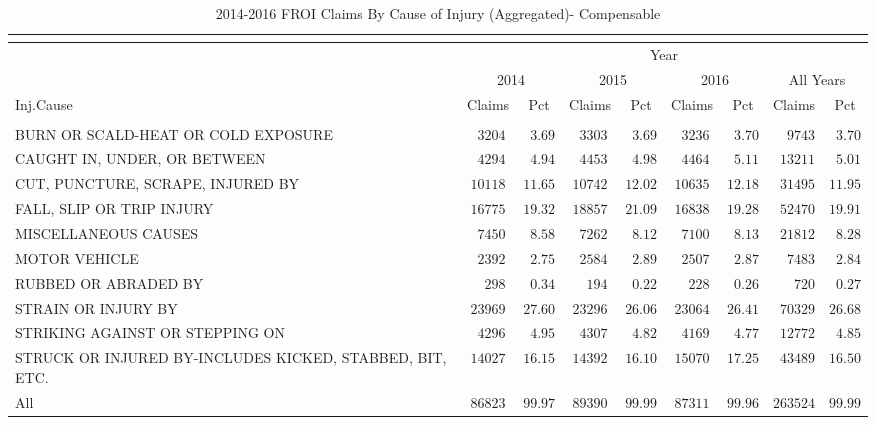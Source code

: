\documentclass[9pt, oneside]{article}   	%
\begin{document}
\begin{longtable}{p{2.5in}cccccccc}
\caption{2014-2016 FROI Claims By Cause of Injury (Aggregated)- Compensable}\\ 
 \label{Table: Two}\\
 \hline
                  \toprule
 & \multicolumn{8}{c}{Year} \\ 
 & \multicolumn{2}{c}{2014} & \multicolumn{2}{c}{2015} & \multicolumn{2}{c}{2016} & \multicolumn{2}{c}{All Years} \\ 
Inj.Cause  & Claims & Pct & Claims & Pct & Claims & Pct & Claims & \multicolumn{1}{c}{Pct} \\ 
\midrule\\ [-1\normalbaselineskip]\hline\endhead\hline\endfoot
BURN OR SCALD-HEAT OR COLD EXPOSURE  & $\phantom{0}3204$ & $\phantom{0}3.69$ & $\phantom{0}3303$ & $\phantom{0}3.69$ & $\phantom{0}3236$ & $\phantom{0}3.70$ & $\phantom{00}9743$ & $\phantom{0}3.70$ \\
CAUGHT IN, UNDER, OR BETWEEN  & $\phantom{0}4294$ & $\phantom{0}4.94$ & $\phantom{0}4453$ & $\phantom{0}4.98$ & $\phantom{0}4464$ & $\phantom{0}5.11$ & $\phantom{0}13211$ & $\phantom{0}5.01$ \\
CUT, PUNCTURE, SCRAPE, INJURED BY  & $10118$ & $11.65$ & $10742$ & $12.02$ & $10635$ & $12.18$ & $\phantom{0}31495$ & $11.95$ \\
FALL, SLIP OR TRIP INJURY  & $16775$ & $19.32$ & $18857$ & $21.09$ & $16838$ & $19.28$ & $\phantom{0}52470$ & $19.91$ \\
MISCELLANEOUS CAUSES  & $\phantom{0}7450$ & $\phantom{0}8.58$ & $\phantom{0}7262$ & $\phantom{0}8.12$ & $\phantom{0}7100$ & $\phantom{0}8.13$ & $\phantom{0}21812$ & $\phantom{0}8.28$ \\
MOTOR VEHICLE  & $\phantom{0}2392$ & $\phantom{0}2.75$ & $\phantom{0}2584$ & $\phantom{0}2.89$ & $\phantom{0}2507$ & $\phantom{0}2.87$ & $\phantom{00}7483$ & $\phantom{0}2.84$ \\
RUBBED OR ABRADED BY  & $\phantom{00}298$ & $\phantom{0}0.34$ & $\phantom{00}194$ & $\phantom{0}0.22$ & $\phantom{00}228$ & $\phantom{0}0.26$ & $\phantom{000}720$ & $\phantom{0}0.27$ \\
STRAIN OR INJURY BY  & $23969$ & $27.60$ & $23296$ & $26.06$ & $23064$ & $26.41$ & $\phantom{0}70329$ & $26.68$ \\
STRIKING AGAINST OR STEPPING ON  & $\phantom{0}4296$ & $\phantom{0}4.95$ & $\phantom{0}4307$ & $\phantom{0}4.82$ & $\phantom{0}4169$ & $\phantom{0}4.77$ & $\phantom{0}12772$ & $\phantom{0}4.85$ \\
STRUCK OR INJURED BY-INCLUDES KICKED, STABBED, BIT, ETC.  & $14027$ & $16.15$ & $14392$ & $16.10$ & $15070$ & $17.25$ & $\phantom{0}43489$ & $16.50$ \\
\cline{1-1} \cline{2-2} \cline{3-3} \cline{4-4} \cline{5-5} \cline{6-6} \cline{7-7}  \cline{8-8} \cline{9-9} %
All  & $86823$ & $99.97$ & $89390$ & $99.99$ & $87311$ & $99.96$ & $263524$ & $99.99$ \\
\hline 
\end{longtable}
\end{document}
